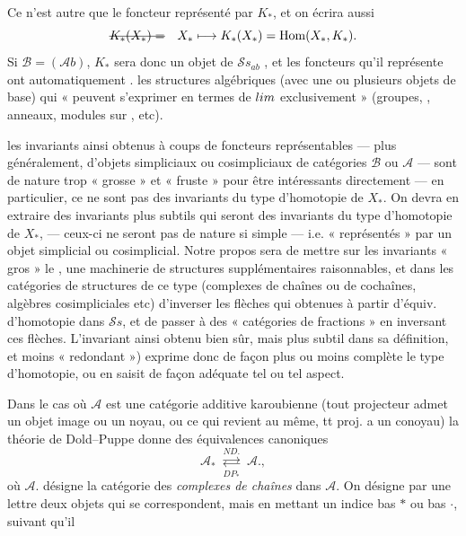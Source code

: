 \documentclass[11pt,a4paper]{article}
\begin{document}
Ce n'est autre que le foncteur représenté par $K_{*}$, et on écrira aussi
\[
  \text{\struck{$K_{*}(X_{*}) = $}} \quad X_{*} \longmapsto K_{*}(X_{*}) = \mathrm{Hom}(X_{*}, K_{*}) .
\]
Si $\mathcal{B} = (\mathcal{A}b)$, $K_{*}$ sera donc un objet de $\mathcal{S}s_{ab}$
\struck{\ill{}}, et les \struck{\ill{}} foncteurs qu'il représente ont
automatiquement \struck{\ill{}}  \ill{}.
 \ill{} les structures algébriques (avec une ou plusieurs
objets de base) qui « peuvent s'exprimer en termes de $\varprojlim$
exclusivement » (groupes, , anneaux, modules sur
\struck{\ill{}} ,  etc).

  les  invariants ainsi obtenus
à coups de foncteurs représentables --- plus généralement, d'objets simpliciaux ou
cosimpliciaux de catégories $\mathcal{B}$ ou $\mathcal{A}$ --- sont de nature trop
« grosse » et « fruste » pour être intéressants directement --- en particulier, ce
ne sont pas des invariants du type d'homotopie de $X_{*}$. On devra en extraire des
invariants plus subtils qui seront des invariants du type d'homotopie de $X_{*}$,
--- ceux-ci ne seront pas de nature si simple --- i.e. « représentés » par un
objet simplicial ou cosimplicial. Notre propos sera de mettre sur les invariants
« gros »  \ill{} le , une machinerie de
structures supplémentaires raisonnables, et dans les catégories de structures de ce
type (complexes de chaînes ou de cochaînes, algèbres cosimpliciales etc)
d'inverser les flèches qui  obtenues à partir d'équiv.
d'homotopie dans $\mathcal{S}s$, et de passer à des « catégories de fractions » en
inversant ces flèches. L'invariant ainsi obtenu \struck{\ill{}}  bien sûr, mais plus subtil dans sa définition, et moins
« redondant ») exprime donc de façon plus ou moins complète le type d'homotopie,
ou en saisit de façon adéquate tel ou tel aspect.

Dans le cas où $\mathcal{A}$ est une catégorie additive karoubienne (tout
projecteur admet un objet image ou un noyau, ou ce qui revient au même, tt proj. a
un conoyau) la théorie de Dold--Puppe donne des équivalences canoniques
\[
  \mathcal{A}_{*} \;\underset{DP_{*}}{\overset{ND.}{\rightleftarrows}}\; \mathcal{A}. ,
\]
où $\mathcal{A}.$ désigne la catégorie des \emph{complexes de chaînes} dans
$\mathcal{A}$. On désigne par une  \struck{=} lettre  deux
objets qui se correspondent, mais en mettant un indice bas $*$ ou bas $\cdot$,
suivant qu'il
\end{document}
